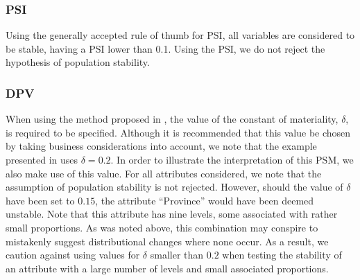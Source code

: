 \documentclass{article}
\theoremstyle{def}
\begin{document}
\subsubsection{PSI}

Using the generally accepted rule of thumb for PSI, all variables are considered to be stable, having a PSI lower than 0.1. Using the PSI, we do not reject the hypothesis of population stability.



\subsubsection{DPV}

When using the method proposed in \cite{DUPISANIEVISAGIE2020}, the value of the constant of materiality, $\delta$, is required to be specified. Although it is recommended that this value be chosen by taking business considerations into account, we note that the example presented in \cite{DUPISANIEVISAGIE2020} uses $\delta=0.2$. In order to illustrate the interpretation of this PSM, we also make use of this value. For all attributes considered, we note that the assumption of population stability is not rejected. However, should the value of $\delta$ have been set to $0.15$, the attribute ``Province'' would have been deemed unstable. Note that this attribute has nine levels, some associated with rather small proportions. As was noted above, this combination may conspire to mistakenly suggest distributional changes where none occur. As a result, we caution against using values for $\delta$ smaller than $0.2$ when testing the stability of an attribute with a large number of levels and small associated proportions.

\end{document}
